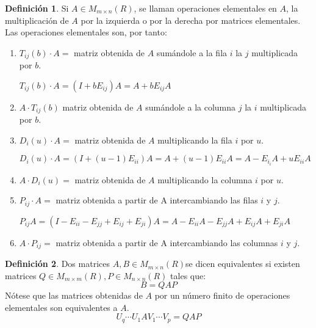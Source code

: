 \documentclass{article}
\theoremstyle{theorem-style}  %
\theoremstyle{definition}
\newtheorem{definition}{Definición}[section]
\theoremstyle{example-style}
\begin{document}
	\begin{definition}
		Si $ A\in M_{m \times n}(R) $, se llaman operaciones elementales en $ A $, la multiplicación de $ A $ por la izquierda o por la derecha por matrices elementales.
		Las operaciones elementales son, por tanto:
		\begin{enumerate}
			\item $ T_{ij}(b) \cdot A = $ matriz obtenida de $ A $ sumándole a la fila $ i $ la $ j $ multiplicada por $ b $.

			$T_{ij}(b) \cdot A=(I+bE_{ij})A=A+bE_{ij}A$
			\item $ A \cdot T_{ij}(b) $ matriz obtenida de $ A $ sumándole a la columna $ j $ la $ i $ multiplicada por $ b $.
			\item $ D_i(u) \cdot A =$ matriz obtenida de $ A $ multiplicando la fila $ i $ por $ u $.

			$ D_i(u)\cdot A= (I+(u-1)E_{ii})A=A+(u-1) E_{ii}A=A-E_{i_i} A +uE_{ii}A $
			\item $ A \cdot D_i(u)  =$ matriz obtenida de $ A $ multiplicando la columna $ i $ por $ u $.
			\item $ P_{ij} \cdot A = $ matriz obtenida a partir de A intercambiando las filas $ i $ y $ j $.

			$ P_{ij}A= (I-E_{ii}-E_{jj}+E_{ij}+E_{ji})A=A-E_{ii}A-E_{jj}A+E_{ij}A+E_{ji}A $
			\item $ A \cdot P_{ij}= $ matriz obtenida a partir de A intercambiando las columnas $ i $ y $ j $.
		\end{enumerate}
	\end{definition}
	\begin{definition}
		Dos matrices $ A, B \in M_{m\times n}(R)  $se dicen equivalentes si existen matrices $ Q \in M_{m\times m}(R), P \in M_{n\times n}(R) $ tales que:
		\[ B=QAP \]
		Nótese que las matrices obtenidas de $ A $ por un número finito de operaciones elementales son equivalentes a $ A $.
		\[ U_q \cdots U_1AV_1\cdots V_p=QAP\]
	\end{definition}
\end{document}
